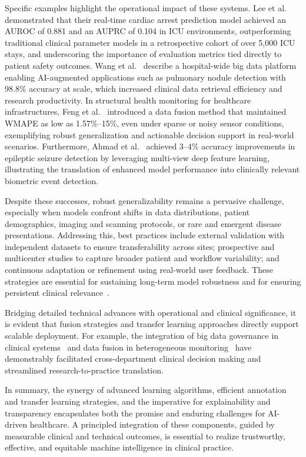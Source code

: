 \documentclass[sigconf]{acmart}
\begin{document}
Specific examples highlight the operational impact of these systems. Lee et al.~\cite{ref80} demonstrated that their real-time cardiac arrest prediction model achieved an AUROC of 0.881 and an AUPRC of 0.104 in ICU environments, outperforming traditional clinical parameter models in a retrospective cohort of over 5{,}000 ICU stays, and underscoring the importance of evaluation metrics tied directly to patient safety outcomes. Wang et al.~\cite{ref84} describe a hospital-wide big data platform enabling AI-augmented applications such as pulmonary nodule detection with 98.8\% accuracy at scale, which increased clinical data retrieval efficiency and research productivity. In structural health monitoring for healthcare infrastructures, Feng et al.~\cite{ref77} introduced a data fusion method that maintained WMAPE as low as 1.57\%–15\%, even under sparse or noisy sensor conditions, exemplifying robust generalization and actionable decision support in real-world scenarios. Furthermore, Ahmad et al.~\cite{ref98} achieved 3–4\% accuracy improvements in epileptic seizure detection by leveraging multi-view deep feature learning, illustrating the translation of enhanced model performance into clinically relevant biometric event detection.

Despite these successes, robust generalizability remains a pervasive challenge, especially when models confront shifts in data distributions, patient demographics, imaging and scanning protocols, or rare and emergent disease presentations. Addressing this, best practices include external validation with independent datasets to ensure transferability across sites; prospective and multicenter studies to capture broader patient and workflow variability; and continuous adaptation or refinement using real-world user feedback. These strategies are essential for sustaining long-term model robustness and for ensuring persistent clinical relevance~\cite{ref77,ref99,ref107}.

Bridging detailed technical advances with operational and clinical significance, it is evident that fusion strategies and transfer learning approaches directly support scalable deployment. For example, the integration of big data governance in clinical systems~\cite{ref84} and data fusion in heterogeneous monitoring~\cite{ref77} have demonstrably facilitated cross-department clinical decision making and streamlined research-to-practice translation.

In summary, the synergy of advanced learning algorithms, efficient annotation and transfer learning strategies, and the imperative for explainability and transparency encapsulates both the promise and enduring challenges for AI-driven healthcare. A principled integration of these components, guided by measurable clinical and technical outcomes, is essential to realize trustworthy, effective, and equitable machine intelligence in clinical practice.
\end{document}
